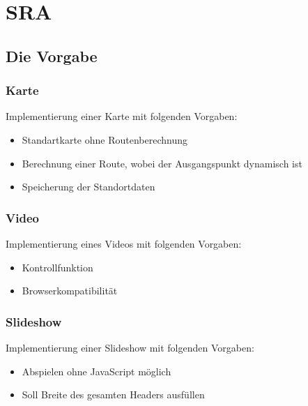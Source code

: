 \section{SRA}
\subsection{Die Vorgabe}
\begin{frame} %
  \frametitle{Karte} %

Implementierung einer Karte mit folgenden Vorgaben:
  \begin{itemize}
   \item Standartkarte ohne Routenberechnung
   \item Berechnung einer Route, wobei der Ausgangspunkt dynamisch ist
   \item Speicherung der Standortdaten
  \end{itemize}
\end{frame}

\begin{frame} %
  \frametitle{Video} %
Implementierung eines Videos mit folgenden Vorgaben:
  \begin{itemize}
   \item Kontrollfunktion
   \item Browserkompatibilität
  \end{itemize}
\end{frame}
 
\begin{frame} %
  \frametitle{Slideshow} %
Implementierung einer Slideshow mit folgenden Vorgaben:
  \begin{itemize}
   \item Abspielen ohne JavaScript möglich
   \item Soll Breite des gesamten Headers ausfüllen
  \end{itemize}
\end{frame}


